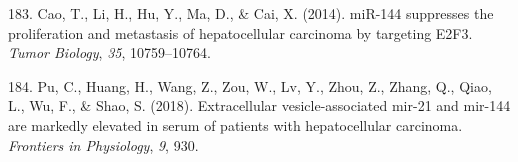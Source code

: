 \documentclass[
  11pt,
  letterpaper,
]{book}
\newlength{\cslhangindent}
\newenvironment{CSLReferences}[2] %
 {\begin{list}{}{%
  \setlength{\itemindent}{0pt}
  \setlength{\leftmargin}{0pt}
  \setlength{\parsep}{0pt}
  \ifodd #1
   \setlength{\leftmargin}{\cslhangindent}
   \setlength{\itemindent}{-1\cslhangindent}
  \fi
  \setlength{\itemsep}{#2\baselineskip}}}
 {\end{list}}
\begin{document}
\begin{CSLReferences}{1}{0}
183. Cao, T., Li, H., Hu, Y., Ma, D., \& Cai, X. (2014). miR-144
suppresses the proliferation and metastasis of hepatocellular carcinoma
by targeting E2F3. \emph{Tumor Biology}, \emph{35}, 10759--10764.

184. Pu, C., Huang, H., Wang, Z., Zou, W., Lv, Y., Zhou, Z., Zhang, Q.,
Qiao, L., Wu, F., \& Shao, S. (2018). Extracellular vesicle-associated
mir-21 and mir-144 are markedly elevated in serum of patients with
hepatocellular carcinoma. \emph{Frontiers in Physiology}, \emph{9}, 930.

\end{CSLReferences}


\backmatter
\end{document}
